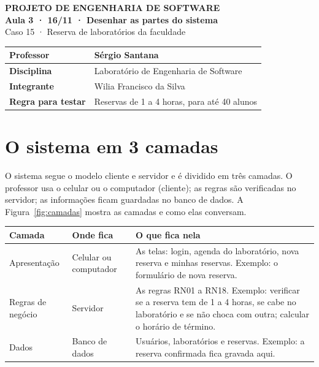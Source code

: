 \documentclass[a4paper,12pt]{article}
\begin{document}
\pagestyle{plain}

\begin{center}
  {\small\bfseries PROJETO DE ENGENHARIA DE SOFTWARE}\\[4pt]
  {\fontsize{16}{20}\selectfont\bfseries Aula 3 · 16/11 · Desenhar as partes do sistema}\\[6pt]
  {\large Caso 15 · Reserva de laboratórios da faculdade}
\end{center}

\vspace{6pt}

\begin{xltabular}{\linewidth}{|l|Y|}
  \hline
  \textbf{Professor} & Sérgio Santana \\ \hline
  \textbf{Disciplina} & Laboratório de Engenharia de Software \\ \hline
  \textbf{Integrante} & Wilia Francisco da Silva \\ \hline
  \textbf{Regra para testar} & Reservas de 1 a 4 horas, para até 40 alunos \\ \hline
\end{xltabular}

\section{O sistema em 3 camadas}

O sistema segue o modelo cliente e servidor e é dividido em três
camadas. O professor usa o celular ou o computador (cliente); as regras
são verificadas no servidor; as informações ficam guardadas no banco de
dados. A Figura~\ref{fig:camadas} mostra as camadas e como elas
conversam.

\begin{center}
  
  \label{fig:camadas}
\end{center}

\begin{xltabular}{\linewidth}{|l|l|Y|}
  \hline
  \textbf{Camada} & \textbf{Onde fica} & \textbf{O que fica nela} \\ \hline
  Apresentação & Celular ou computador & As telas: login, agenda do laboratório, nova reserva e minhas reservas. Exemplo: o formulário de nova reserva. \\ \hline
  Regras de negócio & Servidor & As regras RN01 a RN18. Exemplo: verificar se a reserva tem de 1 a 4 horas, se cabe no laboratório e se não choca com outra; calcular o horário de término. \\ \hline
  Dados & Banco de dados & Usuários, laboratórios e reservas. Exemplo: a reserva confirmada fica gravada aqui. \\ \hline
\end{xltabular}
\end{document}
